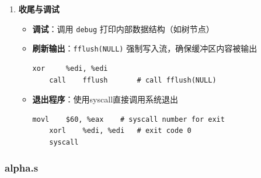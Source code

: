 \documentclass[10pt,a4paper]{article}
\begin{document}
\begin{enumerate}
    \item \textbf{收尾与调试}
    \begin{itemize}
        \item \textbf{调试}：调用 \verb|debug| 打印内部数据结构（如树节点）
        \item \textbf{刷新输出}：\verb|fflush(NULL)| 强制写入流，确保缓冲区内容被输出
        \begin{lstlisting}[language={[x86masm]Assembler}]
    xor     %edi, %edi
    call    fflush       # call fflush(NULL)
        \end{lstlisting}
        \item \textbf{退出程序}：使用syscall直接调用系统退出
        \begin{lstlisting}[language={[x86masm]Assembler}]
    movl    $60, %eax    # syscall number for exit
    xorl    %edi, %edi   # exit code 0
    syscall
        \end{lstlisting}
    \end{itemize}
\end{enumerate}

\subsubsection{alpha.s}
\end{document}
